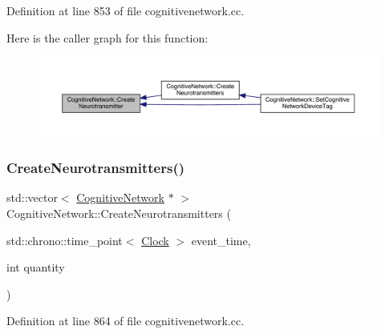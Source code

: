 Definition at line 853 of file cognitivenetwork.\+cc.

Here is the caller graph for this function\+:
\nopagebreak
\begin{figure}[H]
\begin{center}
\leavevmode
\includegraphics[width=350pt]{class_cognitive_network_a53d1047ae3ec721540b64b05abe01559_icgraph}
\end{center}
\end{figure}
\mbox{\label{class_cognitive_network_ad877c495c9efdb582613a5af8d854ac3}} 
\subsubsection{\texorpdfstring{Create\+Neurotransmitters()}{CreateNeurotransmitters()}}
{\footnotesize\ttfamily std\+::vector$<$ \hyperlink{class_cognitive_network}{Cognitive\+Network} $\ast$ $>$ Cognitive\+Network\+::\+Create\+Neurotransmitters (\begin{DoxyParamCaption}\item[{std\+::chrono\+::time\+\_\+point$<$ \hyperlink{universe_8h_a0ef8d951d1ca5ab3cfaf7ab4c7a6fd80}{Clock} $>$}]{event\+\_\+time,  }\item[{int}]{quantity }\end{DoxyParamCaption})}



Definition at line 864 of file cognitivenetwork.\+cc.

